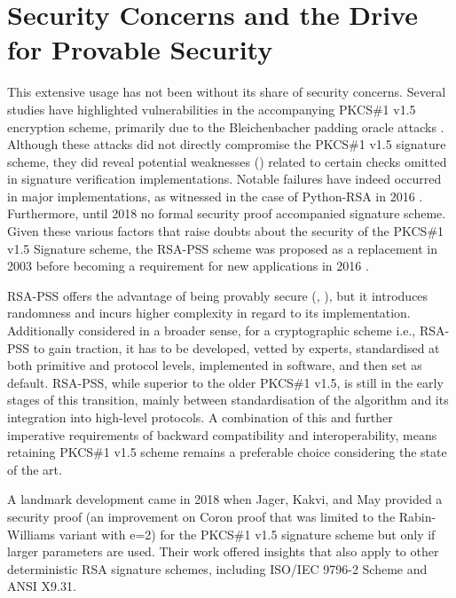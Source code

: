 \documentclass[]{final_report}
\theoremstyle{definition}
\begin{document}
\section{Security Concerns and the Drive for Provable Security}
This extensive usage has not been without its share of security concerns. Several studies have highlighted vulnerabilities in the accompanying PKCS\#1 v1.5 encryption scheme, primarily due to the Bleichenbacher padding oracle attacks \cite{bleichenbacher1998chosen}. Although these attacks did not directly compromise the PKCS\#1 v1.5 signature scheme, they did reveal potential weaknesses (\cite{finney2006bleichenbacher, kuhn2008variants, bock2018return}) related to certain checks omitted in signature verification implementations. Notable failures have indeed occurred in major implementations, as witnessed in the case of Python-RSA in 2016  \cite{bock2018return}. Furthermore, until 2018 no formal security proof accompanied signature scheme. Given these various factors that raise doubts about the security of the PKCS\#1 v1.5 Signature scheme, the RSA-PSS scheme was proposed as a replacement in 2003 \cite{rfc3447} before becoming a requirement for new applications in 2016 \cite{rfc8017}. 

RSA-PSS offers the advantage of being provably secure  (\cite{bellare1996exact}, \cite{jonsson2001security}), but it introduces randomness and incurs higher complexity in regard to its implementation.
Additionally considered in a broader sense, for  a cryptographic scheme i.e., RSA-PSS to gain traction, it has to be developed, vetted by experts, standardised at both primitive and protocol levels, implemented in software, and then set as default. RSA-PSS, while superior to the older PKCS\#1 v1.5, is still in the early stages of this transition, mainly between standardisation of the algorithm and its integration into high-level protocols.
A combination of this and further imperative requirements of backward compatibility and interoperability, means retaining PKCS\#1 v1.5 scheme remains a preferable choice considering the state of the art.

A landmark development came in 2018 when Jager, Kakvi, and May \cite{jager2018security} provided a security proof (an improvement on Coron \cite{coron2002security} proof that was limited to the Rabin-Williams variant with e=2) for the PKCS\#1 v1.5 signature scheme but only if larger parameters are used. Their work offered insights that also apply to other deterministic RSA signature schemes, including ISO/IEC 9796-2 Scheme and ANSI X9.31.
\end{document}
